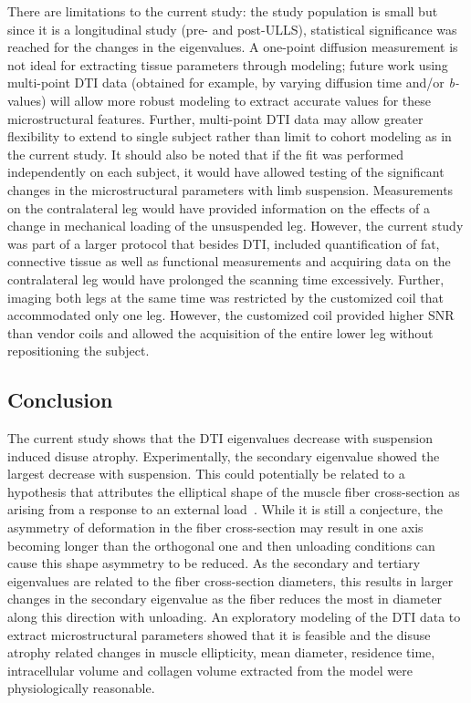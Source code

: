 There are limitations to the current study: the study population is small but since it is a longitudinal study (pre- and post-ULLS), statistical significance was reached for the changes in the eigenvalues. 
A one-point diffusion measurement is not ideal for extracting tissue parameters through modeling; future work using multi-point DTI data (obtained for example, by varying diffusion time and/or \mbox{\textit{b-}value}s) will allow more robust modeling to extract accurate values for these microstructural features. 
Further, multi-point DTI data may allow greater flexibility to extend to single subject rather than limit to cohort modeling as in the current study.
It should also be noted that if the fit was performed independently on each subject, it would have allowed testing of the significant changes in the microstructural parameters with limb suspension.
Measurements on the contralateral leg would have provided information on the effects of a change in mechanical loading of the unsuspended leg.
However, the current study was part of a larger protocol that besides DTI, included quantification of fat, connective tissue as well as functional measurements and acquiring data on the contralateral leg would have prolonged the scanning time excessively.
Further, imaging both legs at the same time was restricted by the customized coil that accommodated only one leg.
However, the customized coil provided higher SNR than vendor coils and allowed the acquisition of the entire lower leg without repositioning the subject.
\subsection{Conclusion}
The current study shows that the DTI eigenvalues decrease with suspension induced disuse atrophy. 
Experimentally, the secondary eigenvalue showed the largest decrease with suspension.
This could potentially be related to a hypothesis that attributes the elliptical shape of the muscle fiber cross-section as arising from a response to an external load~\cite{RND12}. 
While it is still a conjecture, the asymmetry of deformation in the fiber cross-section may result in one axis becoming longer than the orthogonal one and then unloading conditions can cause this shape asymmetry to be reduced. 
As the secondary and tertiary eigenvalues are related to the fiber cross-section diameters, this results in larger changes in the secondary eigenvalue as the fiber reduces the most in diameter along this direction with unloading. 
An exploratory modeling of the DTI data to extract microstructural parameters showed that it is feasible and the disuse atrophy related changes in muscle ellipticity, mean diameter, residence time, intracellular volume and collagen volume extracted from the model were physiologically reasonable.
